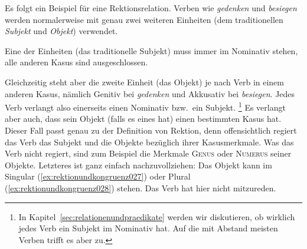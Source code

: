 
Es folgt ein Beispiel für eine Rektionsrelation.
Verben wie \textit{gedenken} und \textit{besiegen} werden normalerweise mit genau zwei weiteren Einheiten (dem traditionellen \textit{Subjekt} und \textit{Objekt}) verwendet.

\begin{exe}
\end{exe}

Eine der Einheiten (das traditionelle Subjekt) muss immer im Nominativ stehen, alle anderen Kasus sind ausgeschlossen.

\begin{exe}
  \ex
  \begin{xlist}
  \end{xlist}
\end{exe}

Gleichzeitig steht aber die zweite Einheit (das Objekt) je nach Verb in einem anderen Kasus, nämlich Genitiv bei \textit{gedenken} und Akkusativ bei \textit{besiegen}.
Jedes Verb verlangt also einerseits einen Nominativ bzw.\ ein Subjekt.%
\footnote{In Kapitel~\ref{sec:relationenundpraedikate} werden wir diskutieren, ob wirklich jedes Verb ein Subjekt im Nominativ hat.
Auf die mit Abstand meisten Verben trifft es aber zu.}
Es verlangt aber auch, dass sein Objekt (falls es eines hat) einen bestimmten Kasus hat.
Dieser Fall passt genau zu der Definition von Rektion, denn offensichtlich regiert das Verb das Subjekt und die Objekte bezüglich ihrer Kasusmerkmale.
Was das Verb nicht regiert, sind zum Beispiel die Merkmale \textsc{Genus} oder \textsc{Numerus} seiner Objekte.
Letzteres ist ganz einfach nachzuvollziehen:
Das Objekt kann im Singular (\ref{ex:rektionundkongruenz027}) oder Plural (\ref{ex:rektionundkongruenz028}) stehen.
Das Verb hat hier nicht mitzureden.

\begin{exe}
  \ex
  \begin{xlist}
  \end{xlist}
\end{exe}

